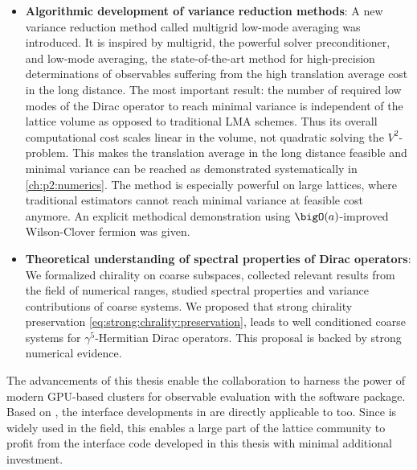 \begin{itemize}
   \item \textbf{Algorithmic development of variance reduction methods}: A new variance reduction method called multigrid low-mode averaging was introduced. It is inspired by multigrid, the powerful solver preconditioner, and low-mode averaging, the state-of-the-art method for high-precision determinations of observables suffering from the high translation average cost in the long distance. The most important result: the number of required low modes of the Dirac operator to reach minimal variance is independent of the lattice volume as opposed to traditional LMA schemes. Thus its overall computational cost scales linear in the volume, not quadratic solving the $V^{2}$-problem. This makes the translation average in the long distance feasible and minimal variance can be reached as demonstrated systematically in \cref{ch:p2:numerics}. The method is especially powerful on large lattices, where traditional estimators cannot reach minimal variance at feasible cost anymore. An explicit methodical demonstration using $\bigO(a)$-improved Wilson-Clover fermion was given.
   \item \textbf{Theoretical understanding of spectral properties of Dirac operators}: We formalized chirality on coarse subspaces, collected relevant results from the field of numerical ranges, studied spectral properties and variance contributions of coarse systems. We proposed that strong chirality preservation \cref{eq:strong:chrality:preservation}, leads to well conditioned coarse systems for $\gamma^{5}$-Hermitian Dirac operators. This proposal is backed by strong numerical evidence.
\end{itemize}


The advancements of this thesis enable the \RCstar collaboration to harness the power of modern GPU-based clusters for observable evaluation with the \openqxd software package.
Based on \openqcd, the interface developments in \openqxd are directly applicable to \openqcd too.
Since \openqcd is widely used in the field, this enables a large part of the lattice community to profit from the interface code developed in this thesis with minimal additional investment.

